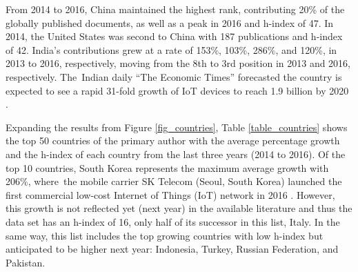 \documentclass[symmetry,article,accept,moreauthors,pdftex10pt,a4paper]{mdpi}
\begin{document}
From 2014 to 2016, China maintained the highest rank, contributing 20\% of the globally published documents, as well as a peak in 2016 and h-index of 47. In 2014, the United States was second to China with 187 publications and h-index of 42. India's contributions grew at a rate of 153\%, 103\%, 286\%, and 120\%, in 2013 to 2016, respectively, moving from the 8th to 3rd position in 2013 and 2016, respectively. The~Indian daily ``The Economic Times'' forecasted the country is expected to see a rapid 31-fold growth of IoT devices to reach 1.9 billion by 2020 \cite{theEconomicTimes2017}. 


Expanding the results from Figure \ref{fig_countries}, Table \ref{table_countries} shows the top 50 countries of the primary author with the average percentage growth and the h-index of each country from the last three years (2014 to 2016). Of the top 10 countries, South Korea represents the maximum average growth with 206\%, where~the mobile carrier SK Telecom (Seoul, South Korea) launched the first commercial low-cost Internet of Things (IoT) network in 2016 \cite{bbcKorea2016}. However, this growth is not reflected yet (next year) in the available literature and thus the data set has an h-index of 16, only half of its successor in this list, Italy. In the same way, this list includes the top growing countries with low h-index but anticipated to be higher next year: Indonesia, Turkey, Russian Federation, and Pakistan.
\end{document}
